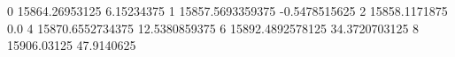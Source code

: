 0 15864.26953125 6.15234375
1 15857.5693359375 -0.5478515625
2 15858.1171875 0.0
4 15870.6552734375 12.5380859375
6 15892.4892578125 34.3720703125
8 15906.03125 47.9140625
